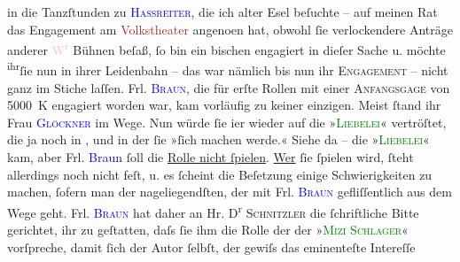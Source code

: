                in die Tanzſtunden zu \textcolor{blue}{\textsc{Hassreiter}}{}\ledrightnote{\textcolor{blue}{Josef Hassreiter}}, die ich alter Esel beſuchte – auf meinen Rat das Engagement am \textcolor{brown}{Volkstheater}{}\ledrightnote{\textcolor{brown}{Volkstheater}} angeno{\geminationm}en hat, obwohl
               ſie verlockendere Anträge anderer \textcolor{pink}{W\textsuperscript{r}}{}\ledrightnote{\textcolor{pink}{Wien}} Bühnen beſaß, ſo bin ein bischen engagiert in dieſer Sache u. möchte \substVorne{}\textsuperscript{ihr}\substDazwischen{}ſie\substHinten{} nun in ihrer Leidenbahn {\pb}– das war nämlich bis nun ihr \textsc{Engagement} – nicht ganz im
               Stiche laſſen. Frl. \textcolor{blue}{\textsc{Braun}}{}\ledrightnote{\textcolor{blue}{Thekla Maria Braun}}, die für erſte Rollen mit einer \textsc{Anfangsgage} von
               5000 K engagiert worden war, kam vorläufig zu keiner einzigen. Meist ſtand ihr Frau
                  \textcolor{blue}{\textsc{Glöckner}}{}\ledrightnote{\textcolor{blue}{Josefine Glöckner}} im Wege. Nun würde ſie i{\geminationm}er wieder auf die »\textcolor{green}{\textsc{Liebelei}}{}\ledrightnote{\textcolor{green}{Liebelei. Schauspiel in drei Akten}}« vertröſtet, die ja noch in \label{K_L01796_2v}\label{K_L01796_2h}, und in der ſie »ſich machen werde.«
               Siehe da – die »\textcolor{green}{\textsc{Liebelei}}{}\ledrightnote{\textcolor{green}{Liebelei. Schauspiel in drei Akten}}« kam, aber Frl. \textcolor{blue}{Braun}{}\ledrightnote{\textcolor{blue}{Thekla Maria Braun}} ſoll die \uline{Rolle nicht ſpielen}. \uline{Wer} ſie ſpielen wird, ſteht allerdings noch nicht feſt, u. es ſcheint die
               Beſetzung einige Schwierigkeiten {\pb}zu machen, ſofern man der nageliegendſten, der mit Frl. \textsc{\textcolor{blue}{Braun}{}\ledrightnote{\textcolor{blue}{Thekla Maria Braun}}} gefliſſentlich aus dem Wege geht. Frl. \textcolor{blue}{\textsc{Braun}}{}\ledrightnote{\textcolor{blue}{Thekla Maria Braun}} hat daher an Hr. D\textsuperscript{r}{ }\textsc{Schnitzler} die ſchriftliche Bitte gerichtet, ihr zu
               geſtatten, daſs ſie ihm die Rolle der der »\textcolor{green}{\textsc{Mizi Schlager}}{}« vorſpreche, damit ſich der Autor ſelbſt, der gewiſs das eminenteſte Intereſſe
